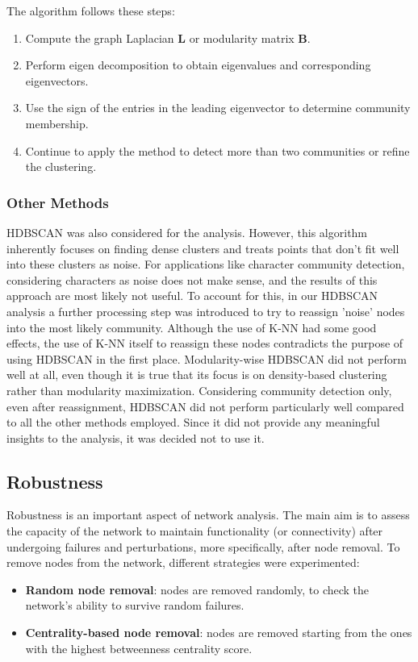 \documentclass[10pt,twocolumn,letterpaper]{article}
\begin{document}
The algorithm follows these steps:

\begin{enumerate}
    \item Compute the graph Laplacian \( \mathbf{L} \) or modularity matrix \( \mathbf{B} \).
    \item Perform eigen decomposition to obtain eigenvalues and corresponding eigenvectors.
    \item Use the sign of the entries in the leading eigenvector to determine community membership.
    \item Continue to apply the method to detect more than two communities or refine the clustering.
\end{enumerate}

\subsubsection{Other Methods}

HDBSCAN was also considered for the analysis. However, this algorithm inherently focuses on finding dense clusters and treats points that don't fit well into these clusters as noise. For applications like character community detection, considering characters as noise does not make sense, and the results of this approach are most likely not useful. To account for this, in our HDBSCAN analysis a further processing step was introduced to try to reassign 'noise' nodes into the most likely community. Although the use of K-NN had some good effects, the use of K-NN itself to reassign these nodes contradicts the purpose of using HDBSCAN in the first place. Modularity-wise HDBSCAN did not perform well at all, even though it is true that its focus is on density-based clustering rather than modularity maximization. Considering community detection only, even after reassignment, HDBSCAN did not perform particularly well compared to all the other methods employed. Since it did not provide any meaningful insights to the analysis, it was decided not to use it.



\subsection{Robustness}

Robustness is an important aspect of network analysis. The main aim is to assess the
capacity of the network to maintain functionality (or connectivity) after undergoing failures
and perturbations, more specifically, after node removal. To remove nodes from the network, different strategies were experimented:
\begin{itemize}
    \item \textbf{Random node removal}: nodes are removed randomly, to check the network’s ability to survive random failures.
    \item \textbf{Centrality-based node removal}: nodes are removed starting from the ones with the highest betweenness centrality score.
\end{itemize}
\end{document}
